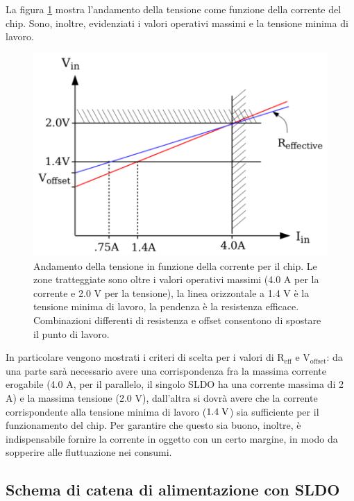 La figura \ref{VVC} mostra l'andamento della tensione come funzione della corrente del chip. Sono, inoltre, evidenziati i valori operativi massimi e la tensione minima di lavoro.
\begin{figure}[!htbp]
\centering
\includegraphics[scale=.3]{Immagini/VoltageVsCurrent}
\caption{Andamento della tensione in funzione della corrente per il chip. Le zone tratteggiate sono oltre i valori operativi massimi (4.0 A per la corrente e 2.0 V per la tensione), la linea orizzontale a 1.4 V è la tensione minima di lavoro, la pendenza è la resistenza efficace. Combinazioni differenti di resistenza e offset consentono di spostare il punto di lavoro.}
\label{VVC}
\end{figure}
In particolare vengono mostrati i criteri di scelta per i valori di $\mathrm{R_{eff}}$ e $\mathrm{V_{offset}}$: da una parte sarà necessario avere una corrispondenza fra la massima corrente erogabile (4.0 A, per il parallelo, il singolo SLDO ha una corrente massima di 2 A) e la massima tensione (2.0 V), dall'altra si dovrà avere che la corrente corrispondente alla tensione minima di lavoro ($1.4 \rm \; V$) sia sufficiente per il funzionamento del chip.
Per garantire che questo sia buono, inoltre, è indispensabile fornire la corrente in oggetto con un certo margine, in modo da sopperire alle fluttuazione nei consumi.

\subsection{Schema di catena di alimentazione con SLDO}

